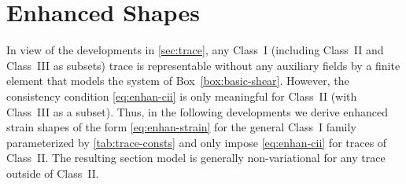 \section{Enhanced Shapes}\label{sec:trace-shapes}
In view of the developments in \cref{sec:trace}, any Class~I (including Class~II and Class~III as subsets) trace is representable without any auxiliary fields by a finite element that models the system of Box~\ref{box:basic-shear}. 
However, the consistency condition \eqref{eq:enhan-cii} is only meaningful for Class~II (with Class~III as a subset). 
Thus, in the following developments we derive enhanced strain shapes of the form \eqref{eq:enhan-strain} 
for the general Class~I family parameterized by \cref{tab:trace-consts} and only impose \eqref{eq:enhan-cii} for traces of Class~II. 
The resulting section model is generally non-variational for any trace outside of Class~II. 


